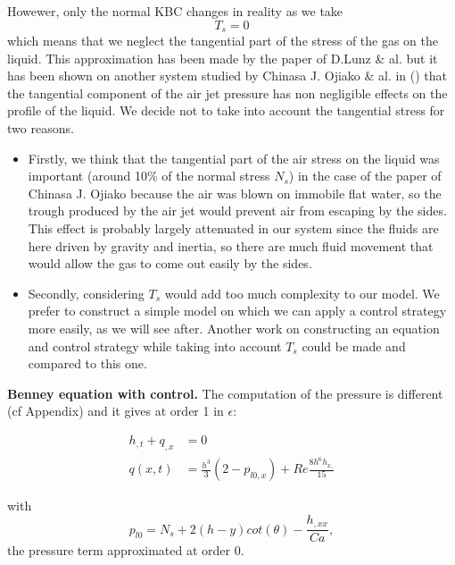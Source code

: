 \documentclass[12pt]{article}
\begin{document}
Howewer, only the normal KBC changes in reality as we take  
\begin{equation}
T_s=0
\end{equation} 
which means that we neglect the tangential part of the stress of the gas on the liquid.  This approximation has been made by the paper 
of D.Lunz \& al. \cite{Moving_pressure_source} but it has been shown on another system studied by Chinasa J. Ojiako \& al. in
 (\cite{Dewetting_Ojiako}) that the tangential component of the air jet pressure has non negligible effects on the profile of the liquid. 
 We decide not to take into account the tangential stress for two reasons.
\begin{itemize}
    \item Firstly, we think that the tangential part of the air stress on the liquid was important (around 10\% of the normal
     stress $N_s$) in the case of the paper of Chinasa J. Ojiako because the air was blown on immobile flat water, so the trough 
     produced by the air jet would prevent air from escaping by the sides. This effect is probably largely attenuated in our system 
     since the fluids are here driven by gravity and inertia, so there are much fluid movement that would allow the gas to come out 
     easily by the sides. 
    \item Secondly, considering $T_s$ would add too much complexity to our model. We prefer to construct a simple model on which
     we can apply a control strategy more easily, as we will see after. Another work on constructing an equation and control strategy while taking into account $T_s$ could be made and compared to this one.
\end{itemize}


\textbf{Benney equation with control.}
The computation of the pressure is different (cf Appendix) and it gives at order 1 in $\epsilon$:

\begin{equation}\label{Benney_ctrl_flux}
\boxed{
\begin{aligned}
    h_{,t}+q_{,x} &= 0\\
    q(x, t) &= \frac{h^3}{3}(2-p_{l0,x})+Re\frac{8h^6h_{x,}}{15}
\end{aligned}
}
\end{equation}

with 
\begin{equation}
p_{l0}= N_s + 2(h-y)cot(\theta) - \frac{h_{,xx}}{Ca},
\end{equation}
the pressure term approximated at order 0.
\end{document}
